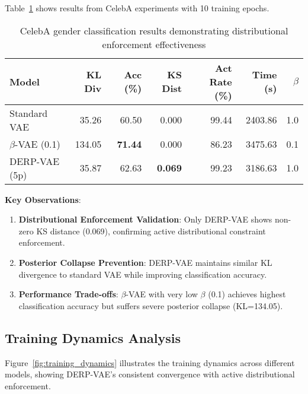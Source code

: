 \documentclass{article}
\begin{document}
Table~\ref{tab:celeba_results} shows results from CelebA experiments with 10 training epochs.

\begin{table}[h]
\caption{CelebA gender classification results demonstrating distributional enforcement effectiveness}
\label{tab:celeba_results}
\centering
\begin{tabular}{lrrrrrr}
\toprule
Model & KL Div & Acc (\%) & KS Dist & Act Rate (\%) & Time (s) & $\beta$ \\
\midrule
Standard VAE & 35.26 & 60.50 & 0.000 & 99.44 & 2403.86 & 1.0 \\
$\beta$-VAE (0.1) & 134.05 & \textbf{71.44} & 0.000 & 86.23 & 3475.63 & 0.1 \\
DERP-VAE (5p) & 35.87 & 62.63 & \textbf{0.069} & 99.23 & 3186.63 & 1.0 \\
\bottomrule
\end{tabular}
\end{table}

\textbf{Key Observations}:

\begin{enumerate}
    \item \textbf{Distributional Enforcement Validation}: Only DERP-VAE shows non-zero KS distance (0.069), confirming active distributional constraint enforcement.
    
    \item \textbf{Posterior Collapse Prevention}: DERP-VAE maintains similar KL divergence to standard VAE while improving classification accuracy.
    
    \item \textbf{Performance Trade-offs}: $\beta$-VAE with very low $\beta$ (0.1) achieves highest classification accuracy but suffers severe posterior collapse (KL=134.05).
\end{enumerate}

\subsection{Training Dynamics Analysis}

Figure~\ref{fig:training_dynamics} illustrates the training dynamics across different models, showing DERP-VAE's consistent convergence with active distributional enforcement.
\end{document}
